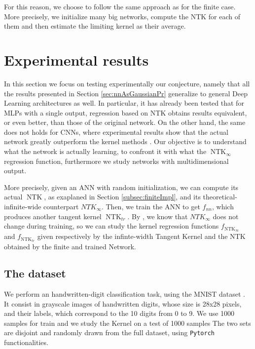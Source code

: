 \documentclass[11pt,notitlepage]{article}
\numberwithin{equation}{section}
\DeclareMathOperator{\NTK}{NTK}
\theoremstyle{remark}
\theoremstyle{definition}
\begin{document}
	For this reason, we choose to follow the same approach as for the finite case.
	More precisely, we initialize many big networks, compute the NTK for each of them and then estimate the limiting kernel as their average.
	
	\section{Experimental results}\label{sec:experiments}
	
	In this section we focus on testing experimentally our conjecture, namely that all the results presented in Section \ref{sec:nnAsGaussianPr} generalize to general Deep Learning architectures as well.
	In particular, it has already been tested that for MLPs with a single output, regression based on NTK obtains results equivalent, or even better, than those of the original network.
	On the other hand, the same does not holds for CNNs, where experimental results show that the actual network greatly outperform the kernel methods \cite{arora2019exact}.
	Our objective is to understand what the network is actually learning, to confront it with what the $\NTK_\infty$ regression function, furthermore we study networks with multidimensional output.
	
	More precisely, given an ANN with random initialization, we can compute its actual $\NTK$, as exaplaned in Section \ref{subsec:finiteImpl}, and its theoretical-infinite-wide counterpart $NTK_\infty$.
	Then, we train the ANN to get $f_{nn}$, which produces another tangent kernel $\NTK_{tr}$.
	By \cite{jacot2018neural}, we know that $NTK_\infty$ does not change during training, so we can study the kernel regression functions $f_{\NTK_\infty}$ and $f_{\NTK_{tr}}$ given respectively by the infinte-width Tangent Kernel and the NTK obtained by the finite and trained Network.
	
	\subsection{The dataset}\label{subsec:dataset}
	
	We perform an handwritten-digit classification task, using the MNIST dataset \cite{lecun2010mnist}.
	It consist in grayscale images of handwritten digits, whose size is 28x28 pixels, and their labels, which correspond to the 10 digits from 0 to 9.	
	We use 1000 samples for train and we study the Kernel on a test of 1000 samples
	The two sets are disjoint and randomly drawn from the full dataset, using \verb|Pytorch| functionalities.
	
\end{document}
